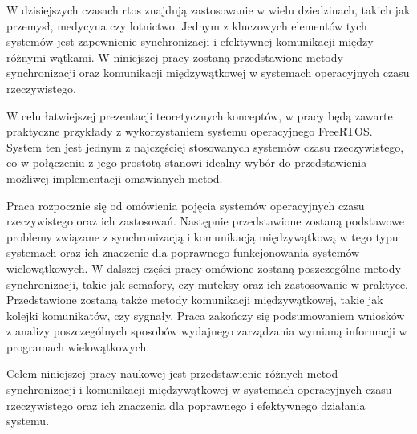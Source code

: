 W dzisiejszych czasach \gls{rtos} znajdują zastosowanie w wielu dziedzinach,
takich jak przemysł, medycyna czy lotnictwo. Jednym z kluczowych elementów tych systemów jest zapewnienie synchronizacji
i efektywnej komunikacji między różnymi wątkami. W niniejszej pracy zostaną przedstawione
metody synchronizacji oraz komunikacji międzywątkowej w systemach operacyjnych czasu rzeczywistego.

W celu łatwiejszej prezentacji teoretycznych konceptów, w pracy będą zawarte praktyczne przykłady
z wykorzystaniem systemu operacyjnego FreeRTOS. System ten jest jednym z najczęściej stosowanych systemów
czasu rzeczywistego, co w połączeniu z jego prostotą stanowi idealny wybór do przedstawienia
możliwej implementacji omawianych metod.

Praca rozpocznie się od omówienia pojęcia systemów operacyjnych czasu rzeczywistego oraz ich zastosowań.
Następnie przedstawione zostaną podstawowe problemy związane z synchronizacją i komunikacją międzywątkową
w tego typu systemach oraz ich znaczenie dla poprawnego funkcjonowania systemów wielowątkowych.
W dalszej części pracy omówione zostaną poszczególne metody synchronizacji, takie jak semafory, czy muteksy
oraz ich zastosowanie w praktyce. Przedstawione zostaną także metody komunikacji
międzywątkowej, takie jak kolejki komunikatów, czy sygnały.
Praca zakończy się podsumowaniem wniosków z analizy poszczególnych sposobów wydajnego zarządzania
wymianą informacji w programach wielowątkowych.

Celem niniejszej pracy naukowej jest przedstawienie różnych metod
synchronizacji i komunikacji międzywątkowej w systemach operacyjnych czasu rzeczywistego oraz ich
znaczenia dla poprawnego i efektywnego działania systemu.
